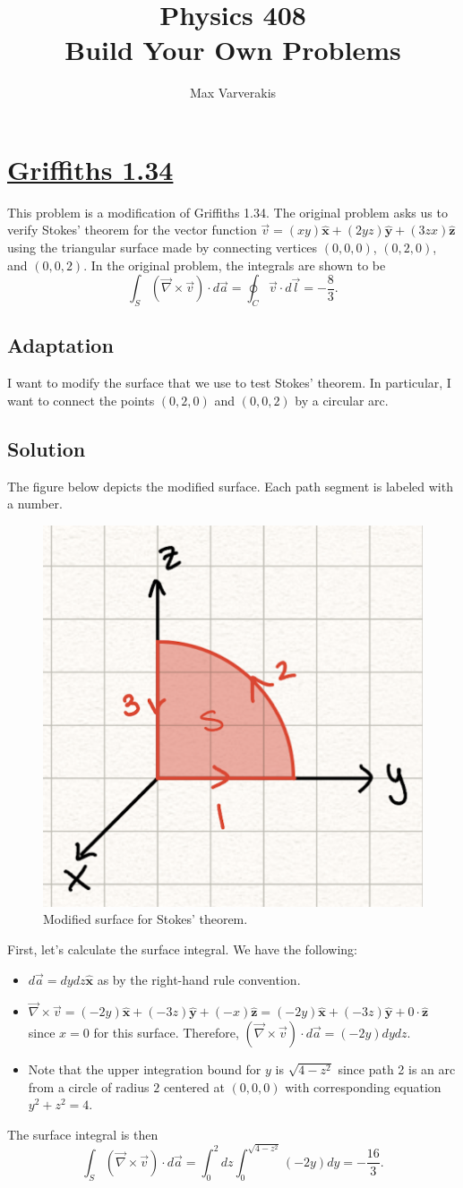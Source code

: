 \documentclass{article}
\title{Physics 408\\[0.5em]
	Build Your Own Problems\\
}
\author{Max Varverakis}
\newcommand{\xhat}{\hat{\textbf{x}}}
\newcommand{\yhat}{\hat{\textbf{y}}}
\newcommand{\zhat}{\hat{\textbf{z}}}
\newcommand{\del}{\vec{\nabla}}
\begin{document}
\maketitle

\section*{\underline{Griffiths 1.34}}
This problem is a modification of Griffiths 1.34. The original problem asks us to verify Stokes' theorem for the vector function $\vec{v} = (xy)\xhat + (2yz)\yhat + (3zx)\zhat$ using the triangular surface made by connecting vertices $(0,0,0)$, $(0,2,0)$, and $(0,0,2)$. In the original problem, the integrals are shown to be
\begin{equation}
	\int_{S}(\del\times\vec{v})\cdot d\vec{a} = \oint_{C}\vec{v}\cdot d\vec{l} = -\frac{8}{3}.
\end{equation}

\subsection*{Adaptation}
I want to modify the surface that we use to test Stokes' theorem. In particular, I want to connect the points $(0,2,0)$ and $(0,0,2)$ by a circular arc.

\subsection*{Solution}
The figure below depicts the modified surface. Each path segment is labeled with a number.
\begin{figure}[htpb]
	\centering
	\includegraphics[width = .25\textwidth]{1.34.png}
\caption{Modified surface for Stokes' theorem.}
\end{figure}

First, let's calculate the surface integral. We have the following:
\begin{itemize}
	\item $d\vec{a} = dydz\xhat$ as by the right-hand rule convention.
	\item $\del\times\vec{v} = (-2y)\xhat + (-3z)\yhat + (-x)\zhat = (-2y)\xhat + (-3z)\yhat + 0\cdot\zhat$ since $x=0$ for this surface. Therefore, $(\del\times\vec{v})\cdot d\vec{a} = (-2y)dydz$.
	\item Note that the upper integration bound for $y$ is $\sqrt{4-z^2}$ since path 2 is an arc from a circle of radius $2$ centered at $(0,0,0)$ with corresponding equation $y^2 + z^2 = 4$.
\end{itemize}
The surface integral is then
\begin{equation}
	\int_S(\del\times\vec{v})\cdot d\vec{a} = \int_0^2dz\int_0^{\sqrt{4-z^2}}(-2y)dy = -\frac{16}{3}.
\end{equation}
\end{document}
